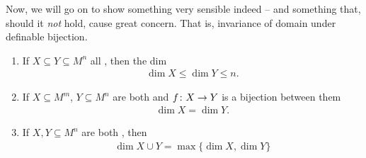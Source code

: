 Now, we will go on to show something very sensible indeed -- and something that, should it \emph{not} hold, cause great concern. That is, invariance of domain under definable bijection.

\begin{proposition}
  \begin{enumerate}
    \item \label{prop:defbij_1} If $X \subseteq Y \subseteq M^n$ all , then the dim
      \begin{align*}
        \dim{X} \leq \dim{Y} \leq n.
      \end{align*}
    \item \label{prop:defbij_2} If $X \subseteq M^m$, $Y \subseteq M^n$ are both  and $f \colon X \to Y$ is a  bijection between them
      \begin{align*}
        \dim{X} = \dim{Y}.
      \end{align*}
    \item \label{prop:defbij_3} If $X, Y \subseteq M^n$ are both , then
      \begin{align*}
        \dim{X \cup Y} = \max{\{ \dim{X}, \dim{Y} \}}
      \end{align*}
  \end{enumerate}  
\end{proposition}


